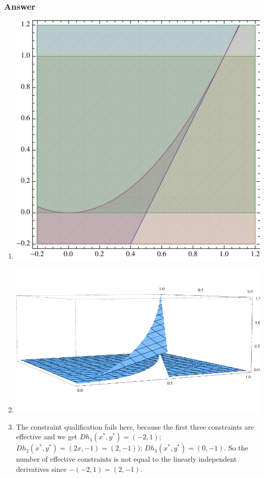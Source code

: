 \documentclass[12pt]{article}
\begin{document}
\subsubsection{Answer}
\begin{enumerate}
\item \includegraphics{region}
\item \includegraphics{height}
\item The constraint qualification fails here, because the first three constraints are effective and we get $Dh_1(x^*,y^*)=(-2,1)$; $Dh_2(x^*,y^*)=(2x,-1)=(2,-1))$; $Dh_3(x^*,y^*)=(0,-1)$. So the number of effective constraints is not equal to the linearly independent derivatives since $-(-2,1)=(2,-1)$.

\end{enumerate}
\end{document}
